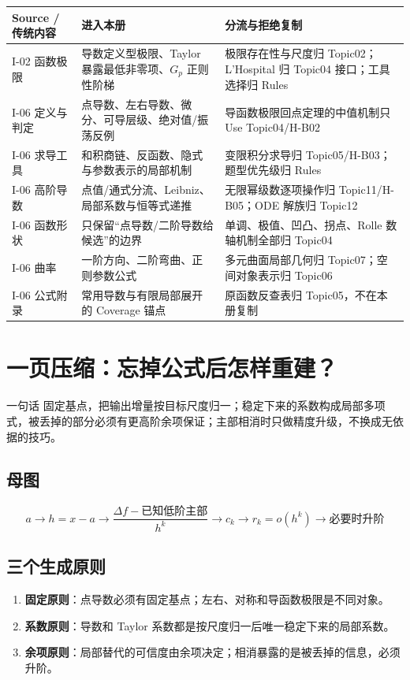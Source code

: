 \documentclass[11pt,a4paper]{ctexart}
\newcommand{\kw}[1]{\textbf{\color{deep}#1}}
\begin{document}
\begin{longtable}{L{2.25cm}L{5.45cm}L{\dimexpr\linewidth-7.70cm\relax}}
\toprule
\textbf{Source / 传统内容} & \textbf{进入本册} & \textbf{分流与拒绝复制}\\
\midrule
I-02 函数极限 & 导数定义型极限、Taylor 暴露最低非零项、$G_p$ 正则性阶梯 & 极限存在性与尺度归 Topic02；L'Hospital 归 Topic04 接口；工具选择归 Rules\\
I-06 定义与判定 & 点导数、左右导数、微分、可导层级、绝对值/振荡反例 & 导函数极限回点定理的中值机制只 Use Topic04/H-B02\\
I-06 求导工具 & 和积商链、反函数、隐式与参数表示的局部机制 & 变限积分求导归 Topic05/H-B03；题型优先级归 Rules\\
I-06 高阶导数 & 点值/通式分流、Leibniz、局部系数与恒等式递推 & 无限幂级数逐项操作归 Topic11/H-B05；ODE 解族归 Topic12\\
I-06 函数形状 & 只保留“点导数/二阶导数给候选”的边界 & 单调、极值、凹凸、拐点、Rolle 数轴机制全部归 Topic04\\
I-06 曲率 & 一阶方向、二阶弯曲、正则参数公式 & 多元曲面局部几何归 Topic07；空间对象表示归 Topic06\\
I-06 公式附录 & 常用导数与有限局部展开的 Coverage 锚点 & 原函数反查表归 Topic05，不在本册复制\\
\bottomrule
\end{longtable}

\section{一页压缩：忘掉公式后怎样重建？}

\begin{corebox}{一句话}
固定基点，把输出增量按目标尺度归一；稳定下来的系数构成局部多项式，被丢掉的部分必须有更高阶余项保证；主部相消时只做精度升级，不换成无依据的技巧。
\end{corebox}

\subsection{母图}
\[
\boxed{
a
\to h=x-a
\to \frac{\Delta f-\text{已知低阶主部}}{h^k}
\to c_k
\to r_k=o(h^k)
\to \text{必要时升阶}}
\]

\subsection{三个生成原则}
\begin{enumerate}
  \item \kw{固定原则}：点导数必须有固定基点；左右、对称和导函数极限是不同对象。
  \item \kw{系数原则}：导数和 Taylor 系数都是按尺度归一后唯一稳定下来的局部系数。
  \item \kw{余项原则}：局部替代的可信度由余项决定；相消暴露的是被丢掉的信息，必须升阶。
\end{enumerate}
\end{document}
